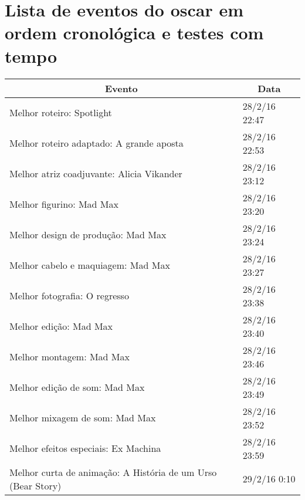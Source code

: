 \chapter{Lista de eventos do oscar em ordem cronol\'{o}gica e testes com tempo}
\begin{table}[H]
	\centering
	\label{oscar-timeline}
	\begin{tabular}{|l|l|}
		\hline
		\multicolumn{1}{|c|}{Evento}                                                       & \multicolumn{1}{c|}{Data} \\ \hline
		Melhor roteiro: Spotlight                                                          & 28/2/16 22:47             \\ \hline
		Melhor roteiro adaptado: A grande aposta                                           & 28/2/16 22:53             \\ \hline
		Melhor atriz coadjuvante: Alicia Vikander                                          & 28/2/16 23:12             \\ \hline
		Melhor figurino: Mad Max                                                           & 28/2/16 23:20             \\ \hline
		Melhor design de produ\c{c}\~{a}o: Mad Max                                                 & 28/2/16 23:24             \\ \hline
		Melhor cabelo e maquiagem: Mad Max                                                 & 28/2/16 23:27             \\ \hline
		Melhor fotografia: O regresso                                                      & 28/2/16 23:38             \\ \hline
		Melhor edi\c{c}\~{a}o: Mad Max                                                             & 28/2/16 23:40             \\ \hline
		Melhor montagem: Mad Max                                                           & 28/2/16 23:46             \\ \hline
		Melhor edi\c{c}\~{a}o de som: Mad Max                                                      & 28/2/16 23:49             \\ \hline
		Melhor mixagem de som: Mad Max                                                     & 28/2/16 23:52             \\ \hline
		Melhor efeitos especiais: Ex Machina                                               & 28/2/16 23:59             \\ \hline
		Melhor curta de anima\c{c}\~{a}o: A Hist\'{o}ria de um Urso (Bear Story)                       & 29/2/16 0:10              \\ \hline

\end{tabular}
\end{table}
